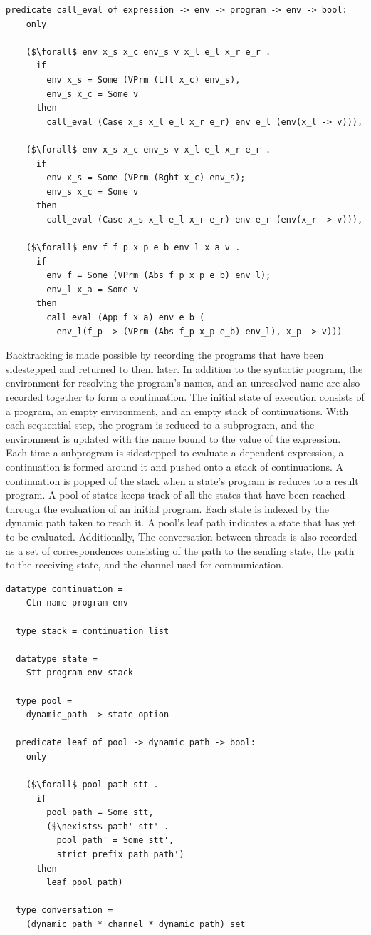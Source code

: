 \documentclass{article}
\begin{document}
\begin{lstlisting}[language=logic, mathescape]
  predicate call_eval of expression -> env -> program -> env -> bool:
    only

    ($\forall$ env x_s x_c env_s v x_l e_l x_r e_r .
      if
        env x_s = Some (VPrm (Lft x_c) env_s),
        env_s x_c = Some v
      then
        call_eval (Case x_s x_l e_l x_r e_r) env e_l (env(x_l -> v))),

    ($\forall$ env x_s x_c env_s v x_l e_l x_r e_r .
      if 
        env x_s = Some (VPrm (Rght x_c) env_s); 
        env_s x_c = Some v
      then
        call_eval (Case x_s x_l e_l x_r e_r) env e_r (env(x_r -> v))),

    ($\forall$ env f f_p x_p e_b env_l x_a v .
      if 
        env f = Some (VPrm (Abs f_p x_p e_b) env_l); 
        env_l x_a = Some v
      then
        call_eval (App f x_a) env e_b (
          env_l(f_p -> (VPrm (Abs f_p x_p e_b) env_l), x_p -> v)))
  \end{lstlisting}
  

Backtracking is made possible by recording the programs that have been sidestepped and
returned to them later. In addition to the syntactic program, the environment for resolving the
program's names, and an unresolved name are also recorded together to form a continuation. 
The initial state of execution consists of a program, an empty environment, and an empty stack
of continuations. With each sequential step, the program is reduced to a subprogram, and the
environment is updated with the name bound to the value of the expression. Each time a
subprogram is sidestepped to evaluate a dependent expression, a continuation is formed around
it and pushed onto a stack of continuations. A continuation is popped of the stack when a
state's program is reduces to a result program.  A pool of states keeps track of all the states
that have been reached through the evaluation of an initial program.  Each state is indexed by
the dynamic path taken to reach it. A pool's leaf path indicates a state that has yet to be
evaluated. Additionally, The conversation between threads is also recorded as a set of
correspondences consisting of the path to the sending state, the path to the receiving state,
and the channel used for communication.  

\begin{lstlisting}[language=logic, mathescape]
  datatype continuation =
    Ctn name program env

  type stack = continuation list

  datatype state =
    Stt program env stack 

  type pool =
    dynamic_path -> state option

  predicate leaf of pool -> dynamic_path -> bool:
    only

    ($\forall$ pool path stt .
      if
        pool path = Some stt,
        ($\nexists$ path' stt' .
          pool path' = Some stt',
          strict_prefix path path')
      then
        leaf pool path)

  type conversation =
    (dynamic_path * channel * dynamic_path) set
  \end{lstlisting}
\end{document}
